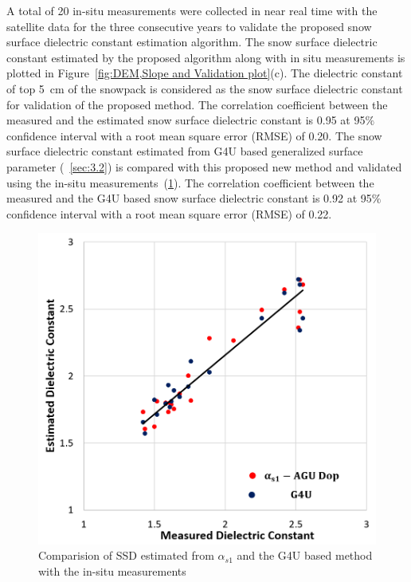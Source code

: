 A total of 20 in-situ measurements were collected in near real time with the satellite data for the three consecutive years to validate the proposed snow surface dielectric constant estimation algorithm. The snow surface dielectric constant estimated by the proposed algorithm along with in situ measurements is plotted in Figure~\ref{fig:DEM,Slope and Validation plot}(c). The dielectric constant of top 5~cm of the snowpack is considered as the snow surface dielectric constant for validation of the proposed method. The correlation coefficient between the measured and the estimated snow surface dielectric constant is 0.95 at 95$\%$ confidence interval with a root mean square error (RMSE) of 0.20. The snow surface dielectric constant estimated from G4U based generalized surface parameter (~\cref{sec:3.2}) is compared with this proposed new method and validated using the in-situ measurements~(\ref{fig:comparision_of_SSD}). The correlation coefficient between the measured and the G4U based snow surface dielectric constant is 0.92 at 95$\%$ confidence interval with a root mean square error (RMSE) of 0.22.

\begin{figure}[!htbp]
	\centering
	\includegraphics[width=0.6\columnwidth]{Figures_SSD/Comparision_plot} 
	\caption [Comparision of SSD]{Comparision of SSD estimated from $\alpha_{s1}$ and the G4U based method with the in-situ measurements }
	\label{fig:comparision_of_SSD}
\end{figure}



\FloatBarrier
